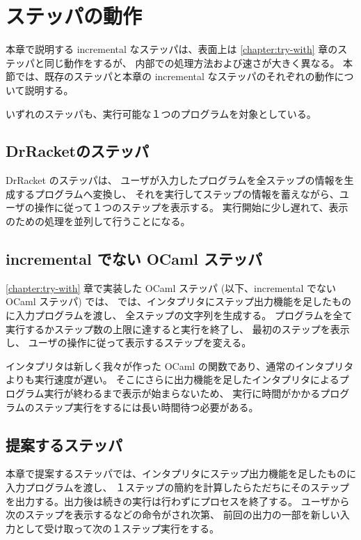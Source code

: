 \section{ステッパの動作}

本章で説明する incremental なステッパは、表面上は \ref{chapter:try-with} 章のステッパと同じ動作をするが、
内部での処理方法および速さが大きく異なる。
本節では、既存のステッパと本章の incremental なステッパのそれぞれの動作について説明する。

いずれのステッパも、実行可能な１つのプログラムを対象としている。

\subsection{DrRacketのステッパ}
\label{ステッパの動作-DrRacketのステッパ}
DrRacket のステッパ\cite{clements01}は、
ユーザが入力したプログラムを全ステップの情報を生成するプログラムへ変換し、
それを実行してステップの情報を蓄えながら、ユーザの操作に従って１つのステップを表示する。
実行開始に少し遅れて、表示のための処理を並列して行うことになる。

\subsection{incremental でない OCaml ステッパ}
\label{ステッパの動作-incrementalでないOCamlステッパ}

\ref{chapter:try-with} 章で実装した OCaml ステッパ (以下、incremental でない OCaml ステッパ) では、
では、インタプリタにステップ出力機能を足したものに入力プログラムを渡し、
全ステップの文字列を生成する。
プログラムを全て実行するかステップ数の上限に達すると実行を終了し、
最初のステップを表示し、
ユーザの操作に従って表示するステップを変える。

インタプリタは新しく我々が作った OCaml の関数であり、通常のインタプリタよりも実行速度が遅い。
そこにさらに出力機能を足したインタプリタによるプログラム実行が終わるまで表示が始まらないため、
実行に時間がかかるプログラムのステップ実行をするには長い時間待つ必要がある。

\subsection{提案するステッパ}
\label{ステッパの動作-提案するステッパ}

本章で提案するステッパでは、インタプリタにステップ出力機能を足したものに入力プログラムを渡し、
１ステップの簡約を計算したらただちにそのステップを出力する。出力後は続きの実行は行わずにプロセスを終了する。
ユーザから次のステップを表示するなどの命令がされ次第、
前回の出力の一部を新しい入力として受け取って次の１ステップ実行をする。

